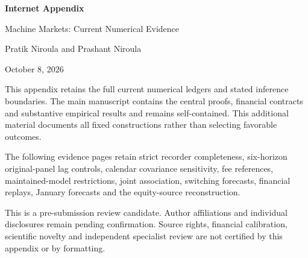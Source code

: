 \documentclass[12pt]{article}
\begin{document}
\thispagestyle{empty}
\begin{center}
{\LARGE\bfseries Internet Appendix}\par
\vspace{1em}
{\large Machine Markets: Current Numerical Evidence}\par
\vspace{1em}
Pratik Niroula and Prashant Niroula\par
October 8, 2026
\end{center}
\vspace{2em}
This appendix retains the full current numerical ledgers and stated inference boundaries. The main manuscript contains the central proofs, financial contracts and substantive empirical results and remains self-contained. This additional material documents all fixed constructions rather than selecting favorable outcomes.

The following evidence pages retain strict recorder completeness, six-horizon original-panel lag controls, calendar covariance sensitivity, fee references, maintained-model restrictions, joint association, switching forecasts, financial replays, January forecasts and the equity-source reconstruction.

This is a pre-submission review candidate. Author affiliations and individual disclosures remain pending confirmation. Source rights, financial calibration, scientific novelty and independent specialist review are not certified by this appendix or by formatting.
\end{document}
